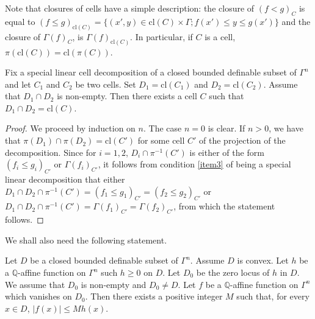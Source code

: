 \documentclass[JEP,XML,SOM,Unicode,ThmDefs,NoEqCountersInSection,published]{cedram}
\newcommand{\cl}{\mathrm{cl}}
\newcommand{\Q}{\mathbb Q}
\theoremstyle{plain}
\theoremstyle{definition}
\begin{document}
Note that closures of cells have a simple description:
the closure of $(f < g)_C$ is equal to $(f \leq g)_{\cl (C)} = \{(x', y) \in \cl (C) \times \Gamma; f (x') \leq y \leq g(x')\}$ and the closure of
$\Gamma (f)_C$, is $\Gamma (f)_{\cl (C)}$.
In particular, if $C$ is a cell, $\pi (\cl (C)) = \cl (\pi (C))$.

\begin{lemm}\label{lemm:cell}Fix a special linear cell decomposition of a closed bounded definable subset of $\Gamma^n$ and let $C_1$ and $C_2$ be two cells. Set $D_1 = \cl (C_1)$ and
$D_2 = \cl (C_2)$. Assume that $D_1 \cap D_2$ is non-empty. Then there exists a cell $C$ such that
$D_1 \cap D_2 = \cl (C)$.
\end{lemm}

\begin{proof}We proceed by induction on $n$.
The case $n=0$ is clear. If $n >0$, we have
that $\pi (D_1) \cap \pi (D_2) = \cl (C')$ for some cell $C'$ of the projection of the decomposition.
Since for $i = 1, 2$, $D_i\cap \pi^{-1} (C')$ is either of the form
$(f_i \leq g_i)_{C'}$ or $\Gamma (f_i)_{C'}$, it follows from condition \eqref{item3} of being a special linear decomposition that either
$D_1 \cap D_2 \cap \pi^{-1} (C')
= (f_1\leq g_1)_{C'}
= (f_ 2\leq g_2)_{C'}$ or
$D_1 \cap D_2 \cap \pi^{-1} (C')
= \Gamma (f_1)_{C'} = \Gamma (f_2)_{C'}$, from which the statement follows.
\end{proof}

We shall also need the following statement.

\begin{lemm}\label{lemm:ineg}Let $D$ be a closed bounded definable subset of
$\Gamma^n$. Assume $D$ is convex. Let $h$ be a $\Q$-affine function on $\Gamma^n$ such $h \geq 0$ on $D$.
Let $D_0$ be the zero locus of $h$ in $D$. We assume that $D_0$ is non-empty and $D_0 \neq D$.
Let $f$ be a $\Q$-affine function on $\Gamma^n$ which vanishes on $D_0$. Then there exists a positive integer
$M$ such that, for every $x \in D$, $\vert f (x) \vert \leq M h (x)$.
\end{lemm}
\end{document}

